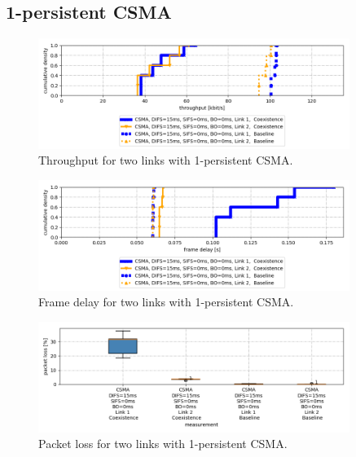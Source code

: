 \clearpage

\subsection{1-persistent CSMA}

\begin{figure}[tb]
	\label{fig:results-difs-only-dbl-throughput}
	\begin{center}
		\includegraphics[width=0.9\textwidth]{pictures/results/same_combinations/difs_only/throughput_cdf}
	\end{center}
	\caption{Throughput for two links with 1-persistent CSMA.}
\end{figure}

\begin{figure}[tb]
	\label{fig:results-difs-only-dbl-frame-delay}
	\begin{center}
		\includegraphics[width=0.9\textwidth]{pictures/results/same_combinations/difs_only/frame_delay_cdf}
	\end{center}
	\caption{Frame delay for two links with 1-persistent CSMA.}
\end{figure}

\begin{figure}[tb]
	\label{fig:results-difs-only-dbl-packet-loss}
	\begin{center}
		\includegraphics[width=0.9\textwidth]{pictures/results/same_combinations/difs_only/packet_loss_boxplot}
	\end{center}
	\caption{Packet loss for two links with 1-persistent CSMA.}
\end{figure}

